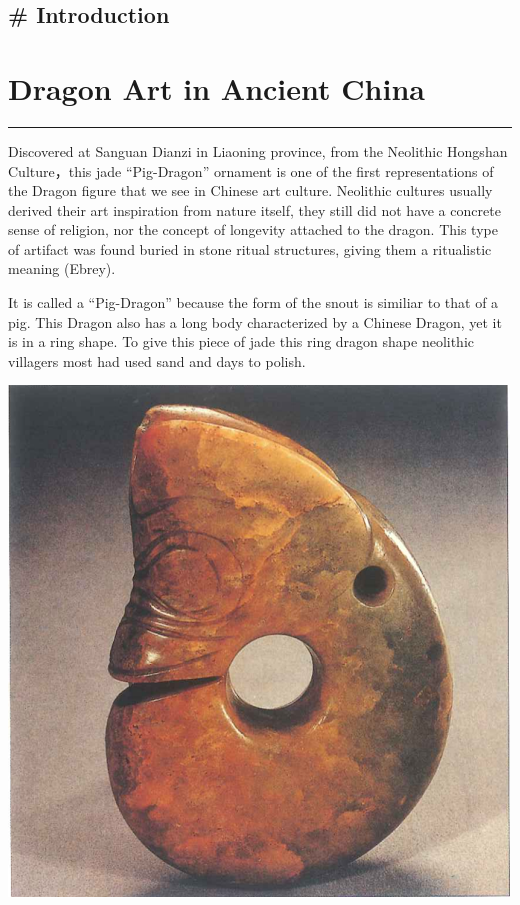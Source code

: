 \documentclass[
]{book}
\begin{document}
\hypertarget{intro}{%
\section*{\# Introduction}\label{intro}}

\hypertarget{ancient}{%
\chapter*{Dragon Art in Ancient China}\label{ancient}}

\begin{center}\rule{0.5\linewidth}{0.5pt}\end{center}

Discovered at Sanguan Dianzi in Liaoning province, from the Neolithic Hongshan Culture，this jade ``Pig-Dragon'' ornament is one of the first representations of the Dragon figure that we see in Chinese art culture. Neolithic cultures usually derived their art inspiration from nature itself, they still did not have a concrete sense of religion, nor the concept of longevity attached to the dragon. This type of artifact was found buried in stone ritual structures, giving them a ritualistic meaning (Ebrey).

It is called a ``Pig-Dragon'' because the form of the snout is similiar to that of a pig. This Dragon also has a long body characterized by a Chinese Dragon, yet it is in a ring shape. To give this piece of jade this ring dragon shape neolithic villagers most had used sand and days to polish.

\includegraphics[width=\textwidth,height=0.35\textheight]{images/Jade_Pig_Dragon.png}
\end{document}
